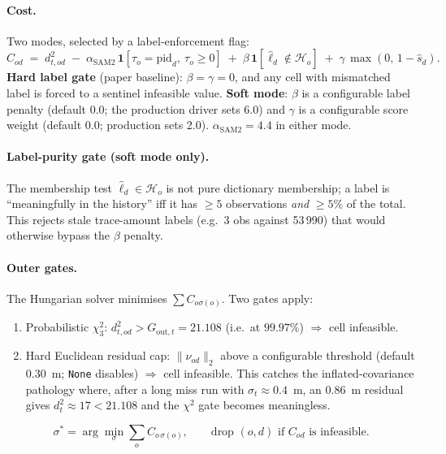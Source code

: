 \documentclass[11pt]{article}
\begin{document}
\paragraph{Cost.}
Two modes, selected by a label-enforcement flag:
\begin{equation}\label{eq:cost_sam2}
C_{od} \;=\; d^2_{t,od}
  \;-\;\alpha_{\text{SAM2}}\,\bm 1[\tau_o = \mathrm{pid}_d,\ \tau_o\ge 0]
  \;+\;\beta\,\bm 1[\hat\ell_d \notin \mathcal H_o]
  \;+\;\gamma\,\max(0,\,1-\hat s_d).
\end{equation}
\textbf{Hard label gate} (paper baseline): $\beta=\gamma=0$, and any cell
with mismatched label is forced to a sentinel infeasible value.
\textbf{Soft mode}: $\beta$ is a configurable label penalty (default 0.0;
the production driver sets 6.0) and $\gamma$ is a configurable score weight
(default 0.0; production sets 2.0). $\alpha_{\text{SAM2}}=4.4$ in either
mode.

\paragraph{Label-purity gate (soft mode only).}
The membership test $\hat\ell_d \in \mathcal H_o$ is not pure dictionary
membership; a label is ``meaningfully in the history'' iff it has $\ge\!5$
observations \emph{and} $\ge\!5\%$ of the total. This rejects stale
trace-amount labels (e.g.\ 3 obs against 53\,990) that would otherwise bypass
the $\beta$ penalty.

\paragraph{Outer gates.}
The Hungarian solver minimises $\sum C_{o\sigma(o)}$. Two gates apply:
\begin{enumerate}[leftmargin=1.5em,itemsep=0pt,topsep=2pt]
\item Probabilistic $\chi^2_3$: $d^2_{t,od} > G_{\text{out},t}=21.108$
  (i.e.\ at $99.97\%$) $\Rightarrow$ cell infeasible.
\item Hard Euclidean residual cap: $\|\nu_{od}\|_2$ above a configurable
  threshold (default $0.30$~m; \texttt{None} disables) $\Rightarrow$ cell
  infeasible. This catches the inflated-covariance pathology where, after
  a long miss run with $\sigma_t\!\approx\!0.4$~m, an $0.86$~m residual gives
  $d^2_t\!\approx\!17 < 21.108$ and the $\chi^2$ gate becomes meaningless.
\end{enumerate}
\begin{equation}\label{eq:hung}
\sigma^* = \arg\min_\sigma \sum_{o} C_{o\,\sigma(o)},\qquad
\text{drop } (o,d) \text{ if } C_{od} \text{ is infeasible}.
\end{equation}
\end{document}
